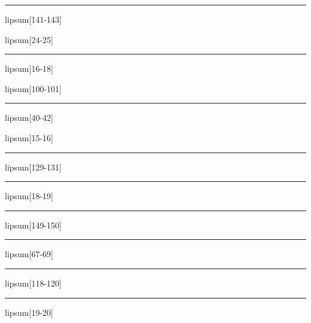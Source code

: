 \documentclass[11pt,a4paper]{article}
\begin{document}
\begin{simplewrap}
  \textcolor{teal!39}{\rule{3.7cm}{9.4cm}}
\end{simplewrap}
lipsum[141-143]

lipsum[24-25]

\begin{simplewrap}
  \textcolor{magenta!20}{\rule{4.2cm}{5.9cm}}
\end{simplewrap}
lipsum[16-18]

lipsum[100-101]

\begin{simplewrap}
  \textcolor{teal!60}{\rule{5.4cm}{4.3cm}}
\end{simplewrap}
lipsum[40-42]

lipsum[15-16]

\begin{simplewrap}
  \textcolor{magenta!13}{\rule{5.2cm}{2.5cm}}
\end{simplewrap}
lipsum[129-131]

\begin{simplewrap}
  \textcolor{cyan!20}{\rule{3.2cm}{6.1cm}}
\end{simplewrap}
lipsum[18-19]

\begin{simplewrap}
  \textcolor{magenta!35}{\rule{3.4cm}{9.1cm}}
\end{simplewrap}
lipsum[149-150]

\begin{simplewrap}
  \textcolor{green!36}{\rule{5.0cm}{6.5cm}}
\end{simplewrap}
lipsum[67-69]

\begin{simplewrap}
  \textcolor{brown!25}{\rule{3.8cm}{3.0cm}}
\end{simplewrap}
lipsum[118-120]

\begin{simplewrap}
  \textcolor{green!10}{\rule{4.4cm}{10.0cm}}
\end{simplewrap}
lipsum[19-20]
\end{document}
